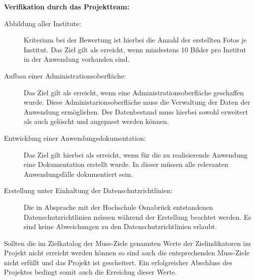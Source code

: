 \textbf{Verifikation durch das Projektteam:}
\begin{description}
  \item[Abbildung aller Institute:]
  Kriterium bei der Bewertung ist hierbei
  die Anzahl der erstellten Fotos je Institut. Das Ziel gilt als erreicht, wenn
  mindestens 10 Bilder pro Institut in der Anwendung vorhanden sind.

  \item[Aufbau einer Administrationsoberfläche:] Das Ziel gilt als erreicht, wenn eine
  Administrationsoberfläche geschaffen wurde. Diese Administarionsoberfläche muss
  die Verwaltung der Daten der Anwendung ermöglichen. Der Datenbestand muss
  hierbei sowohl erweitert als auch gelöscht und angepasst werden können.

  \item[Entwicklung einer Anwendungsdokumentation:] Das Ziel gilt hierbei als erreicht, wenn
  für die zu realisierende Anwendung eine Dokumentation erstellt wurde. In dieser
  müssen alle relevanten Anwendungsfälle dokumentiert sein.

  \item[Erstellung unter Einhaltung der Datenschutzrichtlinien:] 
  Die in Absprache mit der Hochschule Osnabrück entstandenen
  Datenschutzrichtlinien müssen während der Erstellung beachtet werden. Es sind
  keine Abweichungen zu den Datenschutzrichtlinien erlaubt.

\end{description}


Sollten die im Zielkatalog der Muss-Ziele genannten Werte der Zielindikatoren
im Projekt nicht erreicht werden können so sind auch die entsprechenden
Muss-Ziele nicht erfüllt und das Projekt ist gescheitert. Ein erfolgreicher
Abschluss des Projektes bedingt somit auch die Erreichug dieser Werte.

